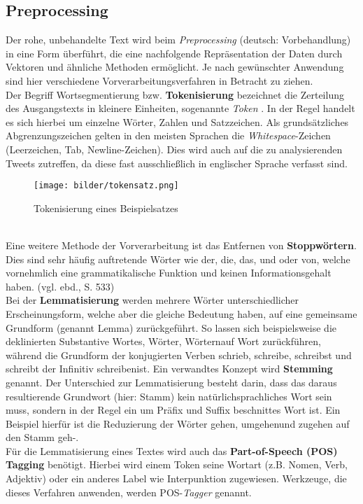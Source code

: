 \subsection{Preprocessing}
Der rohe, unbehandelte Text wird beim \textit{Preprocessing} (deutsch: Vorbehandlung) in eine Form überführt, die eine nachfolgende Repräsentation der Daten durch Vektoren und ähnliche Methoden ermöglicht. Je nach gewünschter Anwendung sind hier verschiedene Vorverarbeitungsverfahren in Betracht zu ziehen.\\
Der Begriff Wortsegmentierung bzw. \textbf{Tokenisierung} bezeichnet die Zerteilung des Ausgangstexts in kleinere Einheiten, sogenannte \textit{Token} \citep{MannSch99}. In der Regel handelt es sich hierbei um einzelne Wörter, Zahlen und Satzzeichen. Als grundsätzliches Abgrenzungszeichen gelten in den meisten Sprachen die \textit{Whitespace}-Zeichen (Leerzeichen, Tab, Newline-Zeichen). Dies wird auch auf die zu analysierenden Tweets zutreffen, da diese fast ausschließlich in englischer Sprache verfasst sind.\\
\begin{figure}[htb]
	\begin{center}
		\texttt{[image: bilder/tokensatz.png]}
		\caption{Tokenisierung eines Beispielsatzes}\label{tokenization}
	\end{center}
\end{figure}\\
Eine weitere Methode der Vorverarbeitung ist das Entfernen von \textbf{Stoppwörtern}. Dies sind sehr häufig auftretende Wörter wie \glqq der\grqq, \glqq die\grqq, \glqq das\grqq, \glqq und\grqq{} oder \glqq von\grqq, welche vornehmlich eine grammatikalische Funktion und keinen Informationsgehalt haben. (vgl. ebd., S. 533)\\
Bei der \textbf{Lemmatisierung} \citep{Air06} werden mehrere Wörter unterschiedlicher Erscheinungsform, welche aber die gleiche Bedeutung haben, auf eine gemeinsame Grundform (genannt Lemma) zurückgeführt.  So lassen sich beispielsweise die deklinierten Substantive \glqq Wortes\grqq, \glqq Wörter\grqq, \glqq Wörtern\grqq auf \glqq Wort\grqq{} zurückführen, während die Grundform der konjugierten Verben \glqq schrieb\grqq, \glqq schreibe\grqq, \glqq schreibst\grqq{} und \glqq schreibt\grqq{} der Infinitiv \glqq schreiben\grqq ist. Ein verwandtes Konzept wird \textbf{Stemming} \citep{Air06} genannt. Der Unterschied zur Lemmatisierung besteht darin, dass das daraus resultierende Grundwort (hier: Stamm) kein natürlichsprachliches Wort sein muss, sondern in der Regel ein um Präfix und Suffix beschnittes Wort ist. Ein Beispiel hierfür ist die Reduzierung der Wörter \glqq gehen\grqq, \glqq umgehen\grqq und \glqq zugehen\grqq{} auf den Stamm \glqq geh-\grqq.\\
Für die Lemmatisierung eines Textes wird auch das \textbf{Part-of-Speech (POS) Tagging} \citep{Kuma15} benötigt. Hierbei wird einem Token seine Wortart (z.B. Nomen, Verb, Adjektiv) oder ein anderes Label wie \glqq Interpunktion\grqq{} zugewiesen. Werkzeuge, die dieses Verfahren anwenden, werden POS-\textit{Tagger} genannt.
